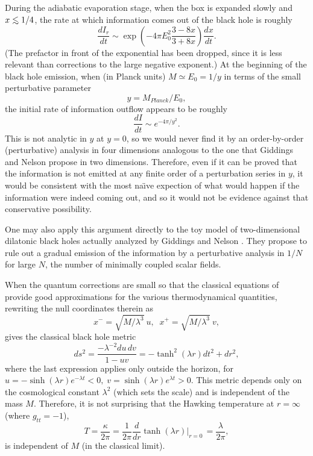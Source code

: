\baselineskip 14.5pt
	During the adiabatic evaporation stage,
when the box is expanded slowly and
$x{\;\raise.3ex\hbox{$<$\kern-.75em\lower1ex\hbox{$\sim$}}\;}1/4$,
the rate at which information comes out of the black hole is roughly
	\begin{equation}
	\frac{dI_r}{dt} \sim \exp(-4\pi E_0^2 \frac{3-8x}{3+8x})
	\frac{dx}{dt}.
	\end{equation}
(The prefactor in front of the exponential has been dropped,
since it is less relevant than corrections to the large negative
exponent.)  At the beginning of the black hole emission,
when (in Planck units) $M \simeq E_0 = 1/y$ in terms of the small
perturbative parameter
	\begin{equation}
	y = M_{Planck}/E_0,
	\end{equation}
the initial rate of information outflow appears to be roughly
	\begin{equation}
	\frac{dI}{dt} \sim e^{-4\pi/y^2}.
	\end{equation}
This is not analytic in $y$ at $y=0$, so we would never find it by
an order-by-order (perturbative) analysis in four dimensions
analogous to the one that Giddings and Nelson propose
\cite{GidNel,Gid92} in two dimensions.  Therefore, even if it
can be proved that the information is not emitted at any finite
order of a perturbation series in $y$, it would be consistent
with the most na\"{\i}ve expection of what would happen if the
information were indeed coming out, and so it would not be
evidence against that conservative possibility.

	One may also apply this argument directly to the toy model
\cite{CGHS} of two-\linebreak dimensional dilatonic black holes
actually analyzed by Giddings and Nelson \cite{GidNel,Gid92}.
They propose to rule out a gradual emission of the information
by a perturbative analysis in $1/N$ for large $N$, the number
of minimally coupled scalar fields.

	When the quantum corrections are small so that
the classical equations of \cite{CGHS} provide good
approximations for the various thermodynamical quantities,
rewriting the null coordinates therein as
	\begin{equation}
	x^-=\sqrt{M/\lambda^3}\:u,\;\;x^+=\sqrt{M/\lambda^3}\:v,
	\end{equation}
gives the classical black hole metric \cite{2DBH}
	\begin{equation}
	ds^2=\frac{-\lambda^{-2} du\,dv}{1-uv}
	=-\tanh^2(\lambda r)dt^2+dr^2,
	\end{equation}
where the last expression applies only outside the horizon,
for $u=-\sinh(\lambda r)e^{-\lambda t}<0,\;
v=\sinh(\lambda r)e^{\lambda t}>0$.  This metric depends
only on the cosmological constant $\lambda^2$
(which sets the scale) and is independent of the mass $M$.
Therefore, it is not surprising that the Hawking temperature
at $r=\infty$ (where $g_{tt}=-1$),
	\begin{equation}
	T=\frac{\kappa}{2\pi}
	=\frac{1}{2\pi}\frac{d}{dr}\tanh(\lambda r)|_{r=0}\,
	=\frac{\lambda}{2\pi},
	\end{equation}
is independent of $M$ (in the classical limit).

